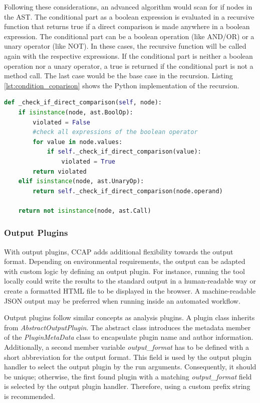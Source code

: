 Following these considerations, an advanced algorithm would scan for if nodes in the AST. The conditional part as a boolean expression is evaluated in a recursive function that returns true if a direct comparison is made anywhere in a boolean expression.
The conditional part can be a boolean operation (like AND/OR) or a unary operator (like NOT).  In these cases, the recursive function will be called again with the respective expressions. If the conditional part is neither a boolean operation nor a unary operator, a true is returned if the conditional part is not a method call. The last case would be the base case in the recursion. Listing \ref{lst:condition_coparison} shows the Python implementation of the recursion.
\begin{minipage}[c]{\linewidth}
\begin{lstlisting}[language=Python, label=lst:condition_coparison, caption={Recursive function to analyse an if statement for direct comparisons. Since a condition should contain a method call, the function returns False if this is not the case.}]
def _check_if_direct_comparison(self, node):
    if isinstance(node, ast.BoolOp):
        violated = False
        #check all expressions of the boolean operator
        for value in node.values:
            if self._check_if_direct_comparison(value):
                violated = True
        return violated
    elif isinstance(node, ast.UnaryOp):
        return self._check_if_direct_comparison(node.operand)

    return not isinstance(node, ast.Call)\end{lstlisting}
\end{minipage}

\subsubsection{Output Plugins}
With output plugins, CCAP adds additional flexibility towards the output format. Depending on environmental requirements, the output can be adapted with custom logic by defining an output plugin. For instance, running the tool locally could write the results to the standard output in a human-readable way or create a formatted HTML file to be displayed in the browser. A machine-readable JSON output may be preferred when running inside an automated workflow.

Output plugins follow similar concepts as analysis plugins. A plugin class inherits from \textit{AbstractOutputPlugin}. The abstract class introduces the metadata member of the \textit{PluginMetaData} class to encapsulate plugin name and author information. Additionally, a second member variable \textit{output\_format} has to be defined with a short abbreviation for the output format. This field is used by the output plugin handler to select the output plugin by the run arguments. Consequently, it should be unique; otherwise, the first found plugin with a matching \textit{output\_format} field is selected by the output plugin handler. Therefore, using a custom prefix string is recommended.

